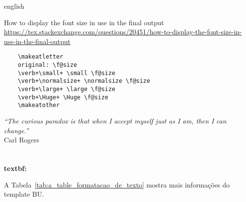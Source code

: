 \begin{otherlanguage*}{english}

    How to display the font size in use in the final output
    \url{https://tex.stackexchange.com/questions/20451/how-to-display-the-font-size-in-use-in-the-final-output}

    \begin{verbatim}
    \makeatletter
    original: \f@size
    \verb+\small+ \small \f@size
    \verb+\normalsize+ \normalsize \f@size
    \verb+\large+ \large \f@size
    \verb+\Huge+ \Huge \f@size
    \makeatother
    \end{verbatim}



    \begin{flushright}
        \textit{``The curious paradox is that when I accept myself just as I am, then I can change.''} \\
        Carl Rogers
    \end{flushright}

    \newpage

    \showfont

    \section[Some encoding tests]{\showfont}

    \sloppy
    \textbf{textbf: \showfont}
    \fussy

\end{otherlanguage*}




A Tabela~\ref{tab:a_table_formatacao_de_texto} mostra mais informações do template BU.


